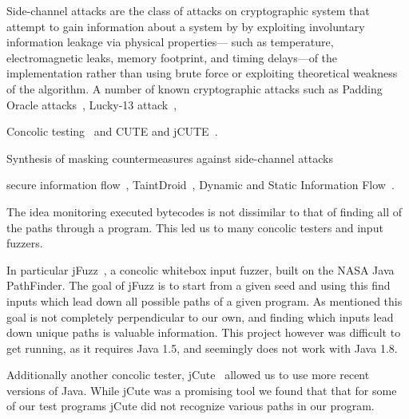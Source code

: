 Side-channel attacks are the class of attacks on cryptographic system that
attempt to gain information about a system by by exploiting involuntary
information leakage via physical properties---
such as temperature, electromagnetic leaks, memory footprint, and timing
delays---of the implementation rather than using brute force or exploiting
theoretical weakness of the algorithm.
A number of known cryptographic attacks such as Padding Oracle
attacks~\cite{Vau02}, Lucky-13 attack~\cite{al2013lucky}, 

Concolic testing~\cite{GKS05} and CUTE and jCUTE~\cite{Sen2006}.


Synthesis of masking countermeasures against side-channel attacks~\cite{EW14}


secure information flow~\cite{Den76}, TaintDroid~\cite{Enck14}, Dynamic and
Static Information Flow~\cite{SR10}.

The idea monitoring executed bytecodes is not dissimilar to that of finding all
of the paths through a program. This led us to many concolic testers and input
fuzzers.  

In particular jFuzz~\cite{jayaraman2009jfuzz}, a concolic whitebox input fuzzer,
built on the NASA Java PathFinder. The goal of jFuzz is to start from a given
seed and using this find inputs which lead down all possible paths of a given
program. As mentioned this goal is not completely perpendicular to our own, and
finding which inputs lead down unique paths is valuable information. This
project however was difficult to get running, as it requires Java 1.5, and
seemingly does not work with Java 1.8. 

Additionally another concolic tester, jCute~\cite{conf/cav/SenA06} allowed us to
use more recent versions of Java. While jCute was a promising tool we found that
that for some of our test programs jCute did not recognize various paths in our
program. 

